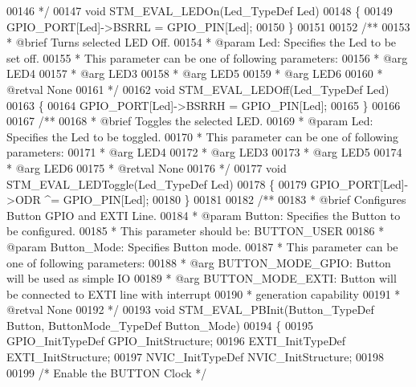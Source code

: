 \begin{DoxyCode}
00146 \textcolor{comment}{  */}
00147 \textcolor{keywordtype}{void} STM_EVAL_LEDOn(Led\_TypeDef Led)
00148 \{
00149   GPIO\_PORT[Led]->BSRRL = GPIO\_PIN[Led];
00150 \}
00151 
00152 \textcolor{comment}{/**}
00153 \textcolor{comment}{  * @brief  Turns selected LED Off.}
00154 \textcolor{comment}{  * @param  Led: Specifies the Led to be set off. }
00155 \textcolor{comment}{  *   This parameter can be one of following parameters:}
00156 \textcolor{comment}{  *     @arg LED4}
00157 \textcolor{comment}{  *     @arg LED3}
00158 \textcolor{comment}{  *     @arg LED5}
00159 \textcolor{comment}{  *     @arg LED6 }
00160 \textcolor{comment}{  * @retval None}
00161 \textcolor{comment}{  */}
00162 \textcolor{keywordtype}{void} STM_EVAL_LEDOff(Led\_TypeDef Led)
00163 \{
00164   GPIO\_PORT[Led]->BSRRH = GPIO\_PIN[Led];
00165 \}
00166 
00167 \textcolor{comment}{/**}
00168 \textcolor{comment}{  * @brief  Toggles the selected LED.}
00169 \textcolor{comment}{  * @param  Led: Specifies the Led to be toggled. }
00170 \textcolor{comment}{  *   This parameter can be one of following parameters:}
00171 \textcolor{comment}{  *     @arg LED4}
00172 \textcolor{comment}{  *     @arg LED3}
00173 \textcolor{comment}{  *     @arg LED5}
00174 \textcolor{comment}{  *     @arg LED6  }
00175 \textcolor{comment}{  * @retval None}
00176 \textcolor{comment}{  */}
00177 \textcolor{keywordtype}{void} STM_EVAL_LEDToggle(Led\_TypeDef Led)
00178 \{
00179   GPIO\_PORT[Led]->ODR ^= GPIO\_PIN[Led];
00180 \}
00181 
00182 \textcolor{comment}{/**}
00183 \textcolor{comment}{  * @brief  Configures Button GPIO and EXTI Line.}
00184 \textcolor{comment}{  * @param  Button: Specifies the Button to be configured.}
00185 \textcolor{comment}{  *   This parameter should be: BUTTON\_USER}
00186 \textcolor{comment}{  * @param  Button\_Mode: Specifies Button mode.}
00187 \textcolor{comment}{  *   This parameter can be one of following parameters:   }
00188 \textcolor{comment}{  *     @arg BUTTON\_MODE\_GPIO: Button will be used as simple IO }
00189 \textcolor{comment}{  *     @arg BUTTON\_MODE\_EXTI: Button will be connected to EXTI line with interrupt}
00190 \textcolor{comment}{  *                            generation capability  }
00191 \textcolor{comment}{  * @retval None}
00192 \textcolor{comment}{  */}
00193 \textcolor{keywordtype}{void} STM_EVAL_PBInit(Button\_TypeDef Button, ButtonMode\_TypeDef Button\_Mode)
00194 \{
00195   GPIO\_InitTypeDef GPIO\_InitStructure;
00196   EXTI\_InitTypeDef EXTI\_InitStructure;
00197   NVIC\_InitTypeDef NVIC\_InitStructure;
00198 
00199   \textcolor{comment}{/* Enable the BUTTON Clock */}

\end{DoxyCode}
